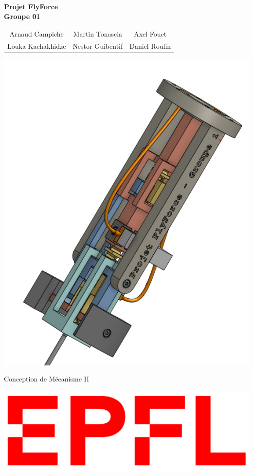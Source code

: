 \begin{titlepage}
    \begin{center}  
        \Huge
        \textbf{Projet FlyForce }\\
        \vspace{0.3cm}
        \textbf {Groupe 01}
        \vspace{1cm}
            
        \normalsize
        \begin{center}
        \begin{tabular}{ c c c }
            Arnaud Campiche    & Martin Tonascia    & Axel Fouet    \\  
            Louka Kachakhidze  & Nestor Guibentif   & Daniel Roulin \\  
         \end{tabular}
         \end{center}
         \vfill

         \includegraphics[width=0.7\linewidth]{images/screen_flyforce.png}

         \vfill
            
       Conception de Mécanisme II \\

       \vspace{1cm}

    \includegraphics[width=0.3\linewidth]{images/logo-epfl.png}

            
    \end{center}
\end{titlepage}